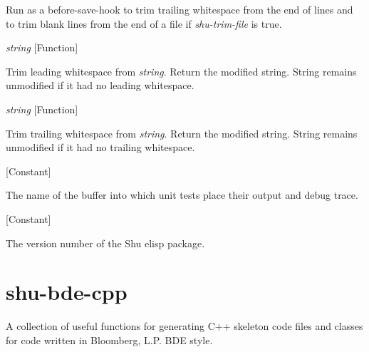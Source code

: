 \begin{doc-string}
Run as a before-save-hook to trim trailing whitespace from the end of lines and
to trim blank lines from the end of a file if \emph{shu-trim-file} is true.
\end{doc-string}

\vspace{1em}
\noindent
{}
\usebox{\funcname}\emph{string}
 \hfill [Function]

\begin{doc-string}
Trim leading whitespace from \emph{string}.  Return the modified string.  String
remains unmodified if it had no leading whitespace.
\end{doc-string}

\vspace{1em}
\noindent
{}
\usebox{\funcname}\emph{string}
 \hfill [Function]

\begin{doc-string}
Trim trailing whitespace from \emph{string}.  Return the modified string.  String
remains unmodified if it had no trailing whitespace.
\end{doc-string}

\vspace{1em}
\noindent
{}
\usebox{\funcname}
 \hfill [Constant]

\begin{doc-string}
The name of the buffer into which unit tests place their output and debug trace.
\end{doc-string}

\vspace{1em}
\noindent
{}
\usebox{\funcname}
 \hfill [Constant]

\begin{doc-string}
The version number of the Shu elisp package.
\end{doc-string}

\eject
\section{shu-bde-cpp}


A collection of useful functions for generating C++ skeleton code files
and classes for code written in Bloomberg, L.P. BDE style.


